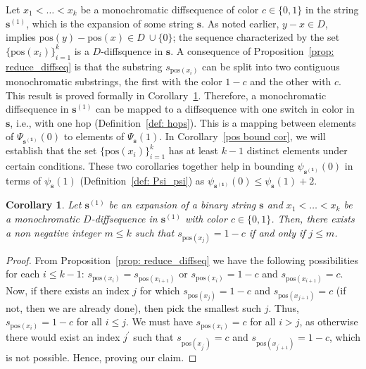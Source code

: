 \documentclass[10pt,a4paper]{amsart}
\newtheorem{cor}{Corollary}
\begin{document}
Let $x_1<\dots<x_k$ be a monochromatic diffsequence of color $c \in \{0,1\}$ in the string $\mathbf{s}^{(1)}$, which is the expansion of some string $\mathbf{s}$. As noted earlier, $y-x \in D$, implies $\text{pos}(y)-\text{pos}(x) \in D \ \cup \{0\}$; the sequence characterized by the set $\{\text{pos}(x_i)\}_{i=1}^{k}$ is a $D$-diffsquence in $\mathbf{s}$. A consequence of Proposition~\ref{prop: reduce_diffseq} is that the substring $s_{\text{pos}(x_i)}$ can be split into two contiguous monochromatic substrings, the first with the color $1-c$ and the other with $c$. This result is proved formally in Corollary~\ref{A B split cor}. Therefore, a monochromatic diffsequence in $\mathbf{s}^{(1)}$ can be mapped to a diffsequence with one switch in color in $\mathbf{s}$, i.e., with one hop (Definition~\ref{def: hops}). This is a mapping between elements of $\Psi_{\mathbf{s^{(1)}}}(0)$ to elements of $\Psi_{\mathbf{s}}(1)$. In Corollary~\ref{pos bound cor}, we will establish that the set $\{\text{pos}(x_i)\}_{i=1}^{k}$ has at least $k-1$ distinct elements under certain conditions. These two corollaries together help in bounding $\psi_{\mathbf{s^{(1)}}}(0)$ in terms of $\psi_{\mathbf{s}}(1)$ (Definition~\ref{def: Psi_psi}) as $\psi_{\mathbf{s^{(1)}}}(0) \le \psi_{\mathbf{s}}(1) +2$.

\begin{cor}\label{A B split cor}
    Let $\mathbf{s}^{(1)}$ be an expansion of a binary string $\mathbf{s}$ and $x_1<\dots<x_k$ be a monochromatic $D$-diffsequence in $\mathbf{s}^{(1)}$ with color $c \in \{0,1\}$. Then, there exists a non negative integer $m\le k$ such that $s_{\text{pos}(x_j)}=1-c$ if and only if $j\le m$.
\end{cor}
\begin{proof}
    From Proposition~\ref{prop: reduce_diffseq} we have the following possibilities for each $i\le k-1$: $s_{\text{pos}(x_i)}=s_{\text{pos}(x_{i+1})}$ or $s_{\text{pos}(x_i)}=1-c$ and $s_{\text{pos}(x_{i+1})}=c$. Now, if there exists an index $j$ for which $s_{\text{pos}(x_j)}=1-c$ and $s_{\text{pos}(x_{j+1})}=c$ (if not, then we are already done), then pick the smallest such $j$. Thus, $s_{\text{pos}(x_i)}=1-c$ for all $i\le j$. We must have $s_{\text{pos}(x_i)}=c$ for all $i>j$, as otherwise there would exist an index $j^{\prime}$ such that $s_{\text{pos}(x_{j^{\prime}})}=c$ and $s_{\text{pos}(x_{j^{\prime}+1})}=1-c$, which is not possible. Hence, proving our claim.
\end{proof}
\end{document}
